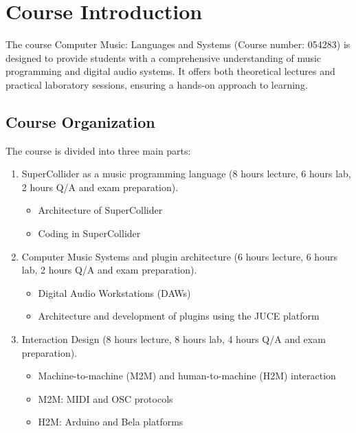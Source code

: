
\chapter{Course Introduction}

The course Computer Music: Languages and Systems (Course number: 054283) is designed to provide students with a comprehensive understanding of music programming and digital audio systems. It offers both theoretical lectures and practical laboratory sessions, ensuring a hands-on approach to learning.

\section{Course Organization}

The course is divided into three main parts:

\begin{enumerate}
    \item SuperCollider as a music programming language (8 hours lecture, 6 hours lab, 2 hours Q/A and exam preparation).
    
    \begin{itemize}
        \item Architecture of SuperCollider
        \item Coding in SuperCollider
    \end{itemize}
    
    \item Computer Music Systems and plugin architecture (6 hours lecture, 6 hours lab, 2 hours Q/A and exam preparation).
    
    \begin{itemize}
        \item Digital Audio Workstations (DAWs)
        \item Architecture and development of plugins using the JUCE platform
    \end{itemize}

    \item Interaction Design (8 hours lecture, 8 hours lab, 4 hours Q/A and exam preparation).
    
    \begin{itemize}
        \item Machine-to-machine (M2M) and human-to-machine (H2M) interaction
        \item M2M: MIDI and OSC protocols
        \item H2M: Arduino and Bela platforms
    \end{itemize}
\end{enumerate}

